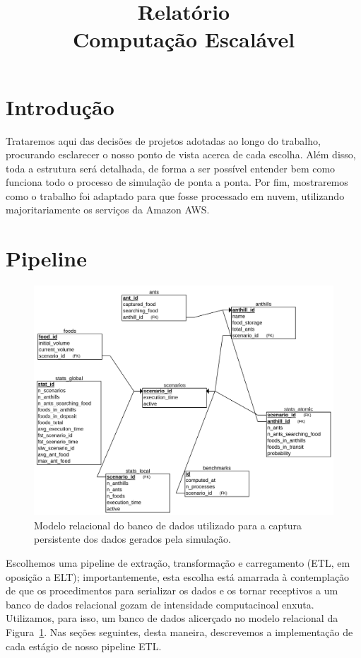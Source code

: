 \documentclass[12pt,oneside,a4paper]{article}
\title{Relatório\\Computação Escalável}
\begin{document}
\maketitle

\tableofcontents
\newpage


\section{Introdução}
    Trataremos aqui das decisões de projetos adotadas ao longo do trabalho, procurando esclarecer o nosso ponto de vista acerca de cada escolha. Além disso, toda a estrutura será detalhada, de forma a ser possível entender bem como funciona todo o processo de simulação de ponta a ponta. Por fim, mostraremos como o trabalho foi adaptado para que fosse processado em nuvem, utilizando majoritariamente os serviços da Amazon AWS.

\section{Pipeline}

	\begin{figure} 
		\centering 
		\includegraphics[width=\textwidth]{../images/relational_diagram.png} 
		\caption{Modelo relacional do banco de dados utilizado para a captura persistente dos dados gerados pela simulação.} 
		\label{fig:relational} 
	\end{figure} 

	Escolhemos uma pipeline de extração, transformação e carregamento (ETL, em oposição a ELT); importantemente, esta escolha está amarrada à contemplação de que os procedimentos para serializar os dados e os tornar receptivos a um banco de dados relacional gozam de intensidade computacinoal enxuta. Utilizamos, para isso, um banco de dados alicerçado no modelo relacional da Figura~\ref{fig:relational}. Nas seções seguintes, desta maneira, descrevemos a implementação de cada estágio de nosso pipeline ETL. 
	
\end{document}
